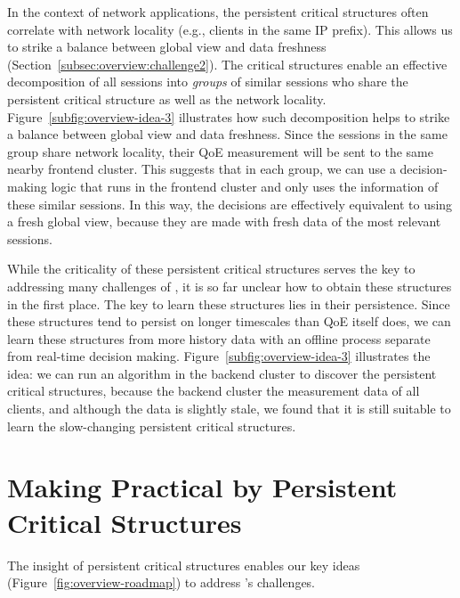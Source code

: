 In the context of network applications, the persistent critical structures often 
correlate with network locality (e.g., clients in the same IP prefix). This allows us to strike
a balance between global view and data freshness (Section~\ref{subsec:overview:challenge2}). 
The critical structures enable an effective decomposition of all sessions into {\em groups} of
similar sessions who share the persistent critical structure as well as the network locality. 
Figure~\ref{subfig:overview-idea-3} illustrates how such decomposition helps to strike
a balance between global view and data freshness. 
Since the sessions in the same group share network locality, their QoE measurement
will be sent to the same nearby frontend cluster. This suggests that in each group, we can 
use a decision-making logic that runs in the frontend cluster and only uses the information 
of these similar sessions. In this way, the decisions are effectively equivalent to using a 
fresh global view, because they are made with fresh data of the most relevant sessions.

While the criticality of these persistent critical structures serves the key to addressing
many challenges of \ddn, it is so far unclear how to obtain these structures in the first place. 
The key to learn these structures lies in their persistence. 
Since these structures tend to persist on longer timescales than QoE itself does, we can learn 
these structures from more history data with an offline process separate from real-time decision 
making. Figure~\ref{subfig:overview-idea-3} illustrates the idea: we can run an algorithm in the 
backend cluster to discover the  persistent critical structures, because the 
backend cluster the measurement data of all clients, and although the data is slightly stale,
we found that it is still suitable to learn the slow-changing persistent critical structures.







\section{Making \ddn Practical by Persistent Critical Structures}
\label{sec:overview:solutions}

The insight of persistent critical structures enables our key ideas 
(Figure~\ref{fig:overview-roadmap})  to address \ddn's challenges. 

